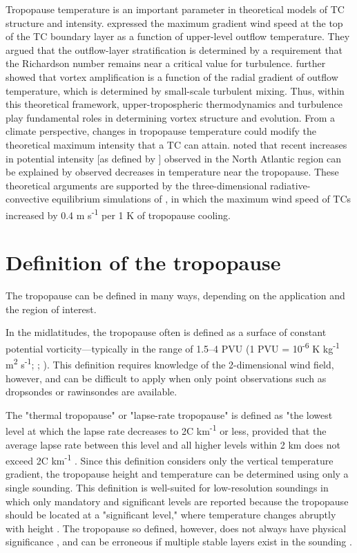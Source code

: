 Tropopause temperature is an important parameter in theoretical models of TC structure and intensity.
\cite{EmanuelRotunno2011} expressed the maximum gradient wind speed at the top of the TC boundary layer as a function of upper-level outflow temperature.
They argued that the outflow-layer stratification is determined by a requirement that the Richardson number remains near a critical value for turbulence.
\cite{Emanuel2012} further showed that vortex amplification is a function of the radial gradient of outflow temperature, which is determined by small-scale turbulent mixing.
Thus, within this theoretical framework, upper-tropospheric thermodynamics and turbulence play fundamental roles in determining vortex structure and evolution.
From a climate perspective, changes in tropopause temperature could modify the theoretical maximum intensity that a TC can attain.
\cite{Emanueletal2013} noted that recent increases in potential intensity [as defined by \cite{BisterEmanuel1998}] observed in the North Atlantic region can be explained by observed decreases in temperature near the tropopause.
These theoretical arguments are supported by the three-dimensional radiative-convective equilibrium simulations of \cite{Wangetal2014}, in which the maximum wind speed of TCs increased by 0.4 m s\textsuperscript{-1} per 1 K of tropopause cooling.

\section{Definition of the tropopause}

The tropopause can be defined in many ways, depending on the application and the region of interest.

In the midlatitudes, the tropopause often is defined as a surface of constant potential vorticity---typically in the range of 1.5--4 PVU (1 PVU = 10\textsuperscript{-6} K kg\textsuperscript{-1} m\textsuperscript{2} s\textsuperscript{-1}; \citeauthor{Wilcoxetal2011} \citeyear{Wilcoxetal2011}; \citeauthor{HoltonHakim} \citeyear{HoltonHakim}).
This definition requires knowledge of the 2-dimensional wind field, however, and can be difficult to apply when only point observations such as dropsondes or rawinsondes are available.

The "thermal tropopause" or "lapse-rate tropopause" is defined as "the lowest level at which the lapse rate decreases to 2\textdegree{}C km\textsuperscript{-1} or less, provided that the average lapse rate between this level and all higher levels within 2 km does not exceed 2\textdegree{}C km\textsuperscript{-1} \citep{WMO1957}.
Since this definition considers only the vertical temperature gradient, the tropopause height and temperature can be determined using only a single sounding.
This definition is well-suited for low-resolution soundings in which only mandatory and significant levels are reported because the tropopause should be located at a "significant level," where temperature changes abruptly with height \citep{YuchechenandCanziani}.
The tropopause so defined, however, does not always have physical significance \citep{HighwoodHoskins1998}, and can be erroneous if multiple stable layers exist in the sounding \citep{Hoerlingetal1991}.

